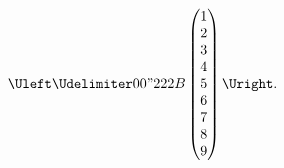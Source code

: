 \documentclass{article}
\begin{document}
$
\Uleft\Udelimiter 0 0 "222B
\begin{pmatrix}
  1\\
  2\\
  3\\
  4\\
  5\\
  6\\
  7\\
  8\\
  9
\end{pmatrix}
\Uright.
$
\end{document}
